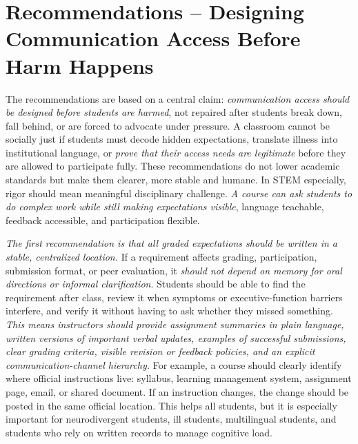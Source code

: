 \section*{Recommendations -- Designing Communication Access Before Harm Happens}

The recommendations are based on a central claim: \textit{communication access should be designed before students are harmed}, not repaired after students break down, fall behind, or are forced to advocate under pressure. A classroom cannot be socially just if students must decode hidden expectations, translate illness into institutional language, or \textit{prove that their access needs are legitimate} before they are allowed to participate fully. These recommendations do not lower academic standards but make them clearer, more stable and humane. In STEM especially, rigor should mean meaningful disciplinary challenge. \textit{A course can ask students to do complex work while still making expectations visible}, language teachable, feedback accessible, and participation flexible.


\textit{The first recommendation is that all graded expectations should be written in a stable, centralized location.} If a requirement affects grading, participation, submission format, or peer evaluation, it \textit{should not depend on memory for oral directions or informal clarification}. Students should be able to find the requirement after class, review it when symptoms or executive-function barriers interfere, and verify it without having to ask whether they missed something. \textit{This means instructors should provide assignment summaries in plain language, written versions of important verbal updates, examples of successful submissions, clear grading criteria, visible revision or feedback policies, and an explicit communication-channel hierarchy.} For example, a course should clearly identify where official instructions live: syllabus, learning management system, assignment page, email, or shared document. If an instruction changes, the change should be posted in the same official location. This helps all students, but it is especially important for neurodivergent students, ill students, multilingual students, and students who rely on written records to manage cognitive load.

